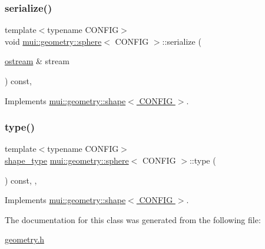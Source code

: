 \mbox{\label{classmui_1_1geometry_1_1sphere_a5f937c4e7878adb9cc8d07b7b9b76131}} 
\subsubsection{\texorpdfstring{serialize()}{serialize()}}
{\footnotesize\ttfamily template$<$typename C\+O\+N\+F\+IG$>$ \\
void \hyperlink{classmui_1_1geometry_1_1sphere}{mui\+::geometry\+::sphere}$<$ C\+O\+N\+F\+IG $>$\+::serialize (\begin{DoxyParamCaption}\item[{\hyperlink{classmui_1_1ostream}{ostream} \&}]{stream }\end{DoxyParamCaption}) const\hspace{0.3cm}{\ttfamily [inline]}, {\ttfamily [virtual]}}



Implements \hyperlink{classmui_1_1geometry_1_1shape_ab1b2e763113b96dd0ae3deedfa0e7d22}{mui\+::geometry\+::shape$<$ C\+O\+N\+F\+I\+G $>$}.

\mbox{\label{classmui_1_1geometry_1_1sphere_a2440f819caae9c92a2cf8c253989c38f}} 
\subsubsection{\texorpdfstring{type()}{type()}}
{\footnotesize\ttfamily template$<$typename C\+O\+N\+F\+IG$>$ \\
\hyperlink{namespacemui_1_1geometry_a5f311a343181e2f20482e5c9afb0f136}{shape\+\_\+type} \hyperlink{classmui_1_1geometry_1_1sphere}{mui\+::geometry\+::sphere}$<$ C\+O\+N\+F\+IG $>$\+::type (\begin{DoxyParamCaption}{ }\end{DoxyParamCaption}) const\hspace{0.3cm}{\ttfamily [inline]}, {\ttfamily [virtual]}, {\ttfamily [noexcept]}}



Implements \hyperlink{classmui_1_1geometry_1_1shape_a4a0fe17b8ca5cc29e260cb38c9fcf8fe}{mui\+::geometry\+::shape$<$ C\+O\+N\+F\+I\+G $>$}.



The documentation for this class was generated from the following file\+:\begin{DoxyCompactItemize}
\item 
\hyperlink{geometry_8h}{geometry.\+h}\end{DoxyCompactItemize}
